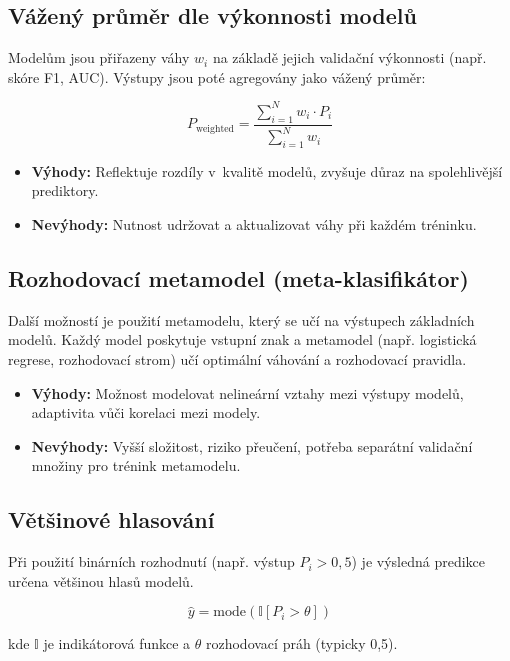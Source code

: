 \subsection{Vážený průměr dle výkonnosti modelů}

Modelům jsou přiřazeny váhy $w_i$ na základě jejich validační výkonnosti (např. skóre F1, AUC). Výstupy jsou poté agregovány jako vážený průměr:

\[
P_{\text{weighted}} = \frac{\sum_{i=1}^{N} w_i \cdot P_i}{\sum_{i=1}^{N} w_i}
\]

\begin{itemize}
    \item \textbf{Výhody:} Reflektuje rozdíly v~kvalitě modelů, zvyšuje důraz na spolehlivější prediktory.
    \item \textbf{Nevýhody:} Nutnost udržovat a aktualizovat váhy při každém tréninku.
\end{itemize}

\subsection{Rozhodovací metamodel (meta-klasifikátor)}

Další možností je použití metamodelu, který se učí na výstupech základních modelů. Každý model poskytuje vstupní znak a metamodel (např. logistická regrese, rozhodovací strom) učí optimální váhování a rozhodovací pravidla.

\begin{itemize}
    \item \textbf{Výhody:} Možnost modelovat nelineární vztahy mezi výstupy modelů, adaptivita vůči korelaci mezi modely.
    \item \textbf{Nevýhody:} Vyšší složitost, riziko přeučení, potřeba separátní validační množiny pro trénink metamodelu.
\end{itemize}

\subsection{Většinové hlasování}

Při použití binárních rozhodnutí (např. výstup $P_i > 0{,}5$) je výsledná predikce určena většinou hlasů modelů.

\[
\hat{y} = \text{mode} \left( \mathbb{I}[P_i > \theta] \right)
\]

kde $\mathbb{I}$ je indikátorová funkce a $\theta$ rozhodovací práh (typicky 0{,}5).

